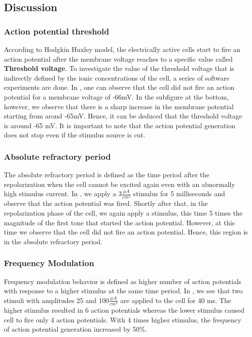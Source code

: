 \documentclass{IEEEtran}
\begin{document}
\subsection{Discussion}
\subsubsection{Action potential threshold}
According to Hodgkin Huxley model, the electrically active cells start to fire an action potential after the membrane voltage reaches to a specific value called \textbf{Threshold voltage}. To investigate the value of the threshold voltage that is indirectly defined by the ionic concentrations of the cell, a series of software experiments are done. In , one can observe that the cell did not fire an action potential for a membrane voltage of -66mV. In the subfigure at the bottom, however, we observe that there is a sharp increase in the membrane potential starting from arond -65mV. Hence, it can be deduced that the threshold voltage is around -65 mV. It is important to note that the action potential generation does not stop even if the stimulus source is cut. 
\subsubsection{Absolute refractory period}
The absolute refractory period is defined as the time period after the repolarization when the cell cannot be excited again even with an abnormally high stimulus current. In , we apply a 3$\frac{\mu A}{cm^2}$ stimulus for 5 milliseconds and observe that the action potential was fired. Shortly after that, in the repolarization phase of the cell, we again apply a stimulus, this time 5 times the magnitude of the first tone that started the action potential. However, at this time we observe that the cell did not fire an action potential. Hence, this region is in the absolute refractory period.
\subsubsection{Frequency Modulation}
Frequency modulation behavior is defined as higher number of action potentials with response to a higher stimulus at the same time period. In , we see that two stimuli with amplitudes 25 and 100$\frac{\mu A}{cm^2}$ are applied to the cell for 40 ms. The higher stimulus resulted in 6 action potentials whereas the lower stimulus caused cell to fire only 4 action potentials. With 4 times higher stimulus, the frequency of action potential generation increased by 50\%. 
\end{document}

